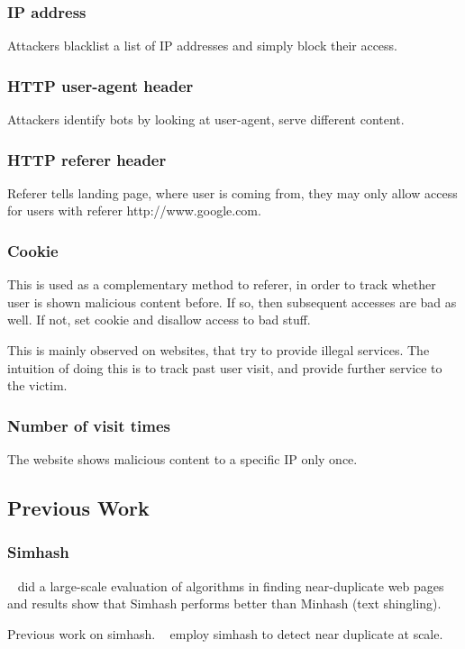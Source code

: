 \subsubsection{IP address}
Attackers blacklist a list of IP addresses and simply block their access.
\subsubsection{HTTP user-agent header}
Attackers identify bots by looking at user-agent, serve different content.
\subsubsection{HTTP referer header}
Referer tells landing page, where user is coming from, they may only allow
access for users with referer http://www.google.com.
\subsubsection{Cookie}
This is used as a complementary method to referer, in order to track whether
user is shown malicious content before. If so, then subsequent accesses are
bad as well. If not, set cookie and disallow access to bad stuff.

This is mainly observed on websites, that try to provide illegal services. The
intuition of doing this is to track past user visit, and provide further service
to the victim.
\subsubsection{Number of visit times}
The website shows malicious content to a specific IP only once.

\subsection{Previous Work}
\subsubsection{Simhash}


~\cite{henzinger2006finding} did a large-scale evaluation of algorithms in
finding near-duplicate web pages and results show that Simhash performs better
than Minhash (text shingling).

Previous work on simhash. ~\cite{manku2007detecting} employ simhash to detect
near duplicate at scale.


